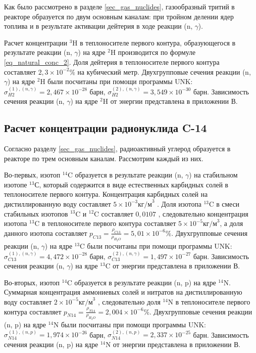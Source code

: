 Как было рассмотрено в разделе \ref{sec_gas_nuclides}, газообразный тритий в реакторе образуется по двум основным 
каналам: при тройном делении ядер топлива и в результате активации дейтерия в ходе реакции (n, $\gamma$). 

Расчет концентрации $^{3}\text{H}$ в теплоносителе первого контура, образующегося в результате реакции (n, $\gamma$) на 
ядре $^{2}\text{H}$ производится по формуле \ref{eq_natural_conc_2}. Доля дейтерия в теплоносителе первого контура 
составляет $2,3 \times 10^{-2} \%$ на кубический метр. Двухгрупповые сечения реакции (n, $\gamma$) на ядре 
$^{2}\text{H}$ были посчитаны при помощи программы UNK: 
$\sigma_{H2}^{(1), (n, \gamma)} = 2,467 \times 10^{-28}$ барн, 
$\sigma_{H2}^{(2), (n, \gamma)} = 3,549 \times 10^{-30}$ барн. 
Зависимость сечения реакции (n, $\gamma$) на ядре $^{2}\text{H}$ от энергии представлена в приложении В.

\subsection{Расчет концентрации радионуклида C-14}

Согласно разделу \ref{sec_gas_nuclides}, радиоактивный углерод образуется в реакторе по трем основным каналам. 
Рассмотрим каждый из них.

Во-первых, изотоп $^{14}\text{C}$ образуется в результате реакции (n, $\gamma$) на стабильном изотопе $^{13}\text{С}$, 
который содержится в виде естественных карбидных солей в теплоносителе первого контура. Концентрация карбидных солей на 
дистиллированную воду составляет $5 \times 10^{-3} \text{кг/м}^{3}$ \cite{gost_water}. Доля изотопа $^{13}\text{C}$ в 
смеси стабильных изотопов $^{13}\text{C}$ и $^{12}\text{C}$ составляет $0,0107$ \cite{audi_carbid_sald}, следовательно 
концентрация изотопа $^{13}\text{C}$ в теплоносителе первого контура составляет $5 \times 10^{-5} \text{кг/м}^{3}$, а 
доля данного изотопа составляет $p_{C13} = \frac{\rho_{C13}}{\rho_{H_{2}O}} = 5,01 \times 10^{-6} \%$. Двухгрупповые 
сечения реакции (n, $\gamma$) на ядре $^{13}\text{C}$ были посчитаны при помощи программы UNK:
$\sigma_{C13}^{(1), (n, \gamma)} = 4,472 \times 10^{-28}$ барн, 
$\sigma_{C13}^{(2), (n, \gamma)} = 1,497 \times 10^{-27}$ барн.
Зависимость сечения реакции (n, $\gamma$) на ядре $^{13}\text{C}$ от энергии представлена в приложении В. 

Во-вторых, изотоп $^{14}\text{C}$ образуется в результате реакции (n, p) на ядре $^{14}\text{N}$. Суммарная концентрация 
аммониевых солей и нитратов на дистиллированную воду составляет $2 \times 10^{-5} \text{кг/м}^{3}$ \cite{gost_water}, 
следовательно доля $^{14}\text{N}$ в теплоносителе первого контура составляет 
$p_{N14} = \frac{\rho_{N14}}{\rho_{H_{2}O}} = 2,004 \times 10^{-6} \%$. Двухгрупповые сечения реакции (n, p) на ядре 
$^{14}\text{N}$ были посчитаны при помощи программы UNK:
$\sigma_{N14}^{(1), (n, p)} = 1,974 \times 10^{-26}$ барн, 
$\sigma_{N14}^{(2), (n, p)} = 2,337 \times 10^{-25}$ барн.
Зависимость сечения реакции (n, p) на ядре $^{14}\text{N}$ от энергии представлена в приложении В.

